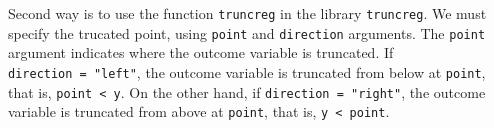 \documentclass[
  12pt,
]{article}
\newenvironment{Shaded}{\begin{snugshade}}{\end{snugshade}}
\newcommand{\ControlFlowTok}[1]{\textcolor[rgb]{0.13,0.29,0.53}{\textbf{#1}}}
\newcommand{\DataTypeTok}[1]{\textcolor[rgb]{0.13,0.29,0.53}{#1}}
\newcommand{\DecValTok}[1]{\textcolor[rgb]{0.00,0.00,0.81}{#1}}
\newcommand{\KeywordTok}[1]{\textcolor[rgb]{0.13,0.29,0.53}{\textbf{#1}}}
\newcommand{\NormalTok}[1]{#1}
\newcommand{\OperatorTok}[1]{\textcolor[rgb]{0.81,0.36,0.00}{\textbf{#1}}}
\newcommand{\OtherTok}[1]{\textcolor[rgb]{0.56,0.35,0.01}{#1}}
\newcommand{\StringTok}[1]{\textcolor[rgb]{0.31,0.60,0.02}{#1}}
\begin{document}
\begin{Shaded}
\end{Shaded}

Second way is to use the function \texttt{truncreg} in the library
\texttt{truncreg}. We must specify the trucated point, using
\texttt{point} and \texttt{direction} arguments. The \texttt{point}
argument indicates where the outcome variable is truncated. If
\texttt{direction\ =\ "left"}, the outcome variable is truncated from
below at \texttt{point}, that is, \texttt{point\ \textless{}\ y}. On the
other hand, if \texttt{direction\ =\ "right"}, the outcome variable is
truncated from above at \texttt{point}, that is,
\texttt{y\ \textless{}\ point}.
\end{document}
